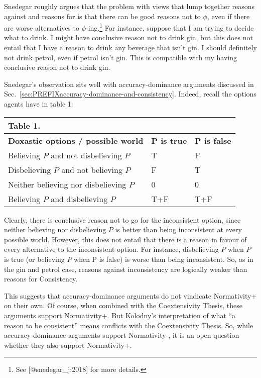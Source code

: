 \documentclass[
]{article}
\begin{document}
Snedegar roughly argues that the problem with views that lump together
reasons against and reasons for is that there can be good reasons not to
\(\phi\), even if there are worse alternatives to
\(\phi\)-ing.\footnote{See {[}@snedegar\_j:2018{]} for more details.}
For instance, suppose that I am trying to decide what to drink. I might
have conclusive reason not to drink gin, but this does not entail that I
have a reason to drink any beverage that isn't gin. I should definitely
not drink petrol, even if petrol isn't gin. This is compatible with my
having conclusive reason not to drink gin.

Snedegar's observation sits well with accuracy-dominance arguments
discussed in Sec.~\ref{sec:PREFIXaccuracy-dominance-and-consistency}.
Indeed, recall the options agents have in table 1:

\begin{longtable}[]{@{}lll@{}}
\toprule
Table 1. & & \\
\midrule
\endhead
\textbf{Doxastic options / possible world} & \textbf{P is true} &
\textbf{P is false} \\
Believing \(P\) and not disbelieving \(P\) & T & F \\
Disbelieving \(P\) and not believing \(P\) & F & T \\
Neither believing nor disbelieving \(P\) & 0 & 0 \\
Believing \(P\) and disbelieving \(P\) & T+F & T+F \\
\bottomrule
\end{longtable}

\noindent Clearly, there is conclusive reason not to go for the
inconsistent option, since neither believing nor disbelieving \(P\) is
better than being inconsistent at every possible world. However, this
does not entail that there is a reason in favour of every alternative to
the inconsistent option. For instance, disbelieving \(P\) when \(P\) is
true (or believing \(P\) when P is false) is worse than being
inconsistent. So, as in the gin and petrol case, reasons against
inconsistency are logically weaker than reasons for Consistency.

This suggests that accuracy-dominance arguments do not vindicate
Normativity+ on their own. Of course, when combined with the
Coextensivity Thesis, these arguments support Normativity+. But
Kolodny's interpretation of what ``a reason to be consistent'' means
conflicts with the Coextensivity Thesis. So, while accuracy-dominance
arguments support Normativity-, it is an open question whether they also
support Normativity+.
\end{document}
